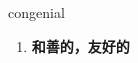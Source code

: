 
\begin{frame}
{\huge congenial}
\begin{center}
\begin{enumerate}\Large
  \item \textbf{和善的，友好的}
\end{enumerate}
\end{center}
\end{frame}
